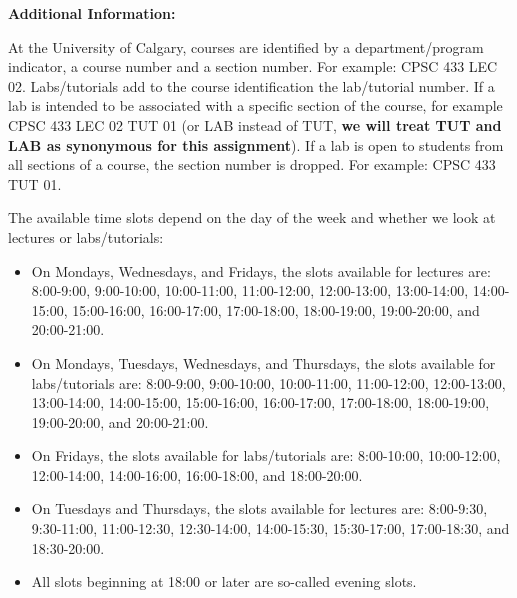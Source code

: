 \documentclass[11pt, oneside]{article}   	%
\begin{document}
\noindent \textbf{Additional Information:}
\par At the University of Calgary, courses are identified by a department/program indicator, a course number and a section number. For example: CPSC 433 LEC 02. Labs/tutorials add to the course identification the lab/tutorial number. If a lab is intended to be associated with a specific section of the course, for example CPSC 433 LEC 02 TUT 01 (or LAB instead of TUT, \textbf{we will treat TUT and LAB as synonymous for this assignment}). If a lab is open to students from all sections of a course, the section number is dropped. For example: CPSC 433 TUT 01.
\par The available time slots depend on the day of the week and whether we look at lectures or labs/tutorials:
\begin{itemize}[topsep=0pt, itemsep=0pt]
\item On Mondays, Wednesdays, and Fridays, the slots available for lectures are: 8:00-9:00, 9:00-10:00, 10:00-11:00, 11:00-12:00, 12:00-13:00, 13:00-14:00, 14:00-15:00, 15:00-16:00, 16:00-17:00, 17:00-18:00, 18:00-19:00, 19:00-20:00, and 20:00-21:00.
\item On Mondays, Tuesdays, Wednesdays, and Thursdays, the slots available for labs/tutorials are: 8:00-9:00, 9:00-10:00, 10:00-11:00, 11:00-12:00, 12:00-13:00, 13:00-14:00, 14:00-15:00, 15:00-16:00, 16:00-17:00, 17:00-18:00, 18:00-19:00, 19:00-20:00, and 20:00-21:00.
\item On Fridays, the slots available for labs/tutorials are: 8:00-10:00, 10:00-12:00, 12:00-14:00, 14:00-16:00, 16:00-18:00, and 18:00-20:00.
\item On Tuesdays and Thursdays, the slots available for lectures are: 8:00-9:30, 9:30-11:00, 11:00-12:30, 12:30-14:00, 14:00-15:30, 15:30-17:00, 17:00-18:30, and 18:30-20:00.
\item All slots beginning at 18:00 or later are so-called evening slots.
\end{itemize}
\end{document}
